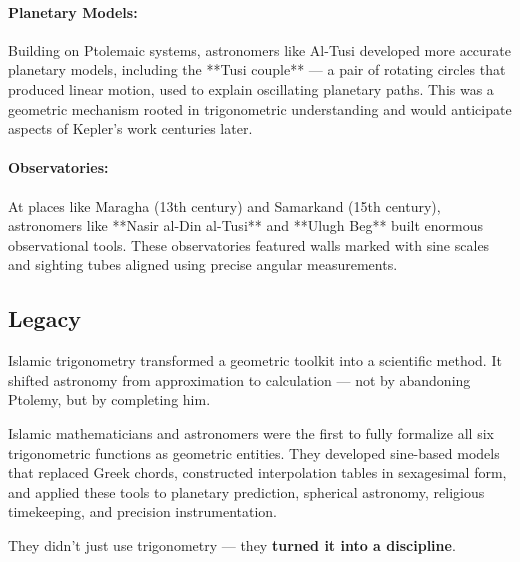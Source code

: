\paragraph{Planetary Models:} Building on Ptolemaic systems, astronomers like Al-Tusi developed more accurate planetary models, including the **Tusi couple** — a pair of rotating circles that produced linear motion, used to explain oscillating planetary paths. This was a geometric mechanism rooted in trigonometric understanding and would anticipate aspects of Kepler's work centuries later.

\paragraph{Observatories:} At places like Maragha (13th century) and Samarkand (15th century), astronomers like **Nasir al-Din al-Tusi** and **Ulugh Beg** built enormous observational tools. These observatories featured walls marked with sine scales and sighting tubes aligned using precise angular measurements.

\subsection{Legacy}

Islamic trigonometry transformed a geometric toolkit into a scientific method. It shifted astronomy from approximation to calculation — not by abandoning Ptolemy, but by completing him.

\medskip

\begin{tcolorbox}[colback=gray!5!white, colframe=black, title=\textbf{TL;DR: When Trigonometry Became a Science}, fonttitle=\bfseries, arc=1.5mm, boxrule=0.4pt]
Islamic mathematicians and astronomers were the first to fully formalize all six trigonometric functions as geometric entities. They developed sine-based models that replaced Greek chords, constructed interpolation tables in sexagesimal form, and applied these tools to planetary prediction, spherical astronomy, religious timekeeping, and precision instrumentation.

They didn’t just use trigonometry — they \textbf{turned it into a discipline}.
\end{tcolorbox}

